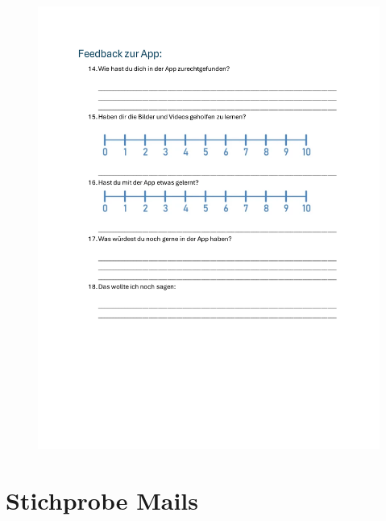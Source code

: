 \begin{figure}[!h]
\begin{minipage}[t]{0.49\textwidth}
        \includegraphics[width=\textwidth]{Picture/seite4.pdf}
    \end{minipage}
\end{figure}

\newpage

\section{Stichprobe Mails}

